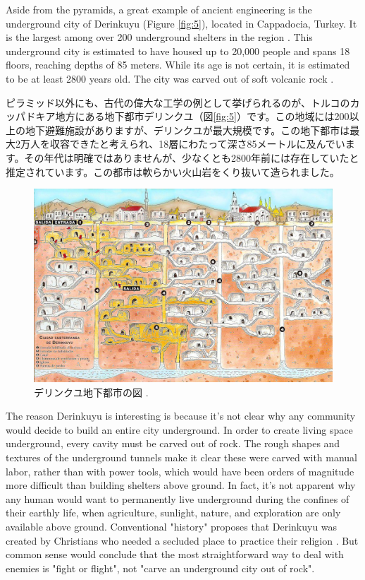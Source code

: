 \documentclass[10pt,twocolumn,letterpaper]{article}
\begin{document}
Aside from the pyramids, a great example of ancient engineering is the underground city of Derinkuyu (Figure \ref{fig:5}), located in Cappadocia, Turkey. It is the largest among over 200 underground shelters in the region \cite{54}. This underground city is estimated to have housed up to 20,000 people and spans 18 floors, reaching depths of 85 meters. While its age is not certain, it is estimated to be at least 2800 years old. The city was carved out of soft volcanic rock \cite{52, 53}.

ピラミッド以外にも、古代の偉大な工学の例として挙げられるのが、トルコのカッパドキア地方にある地下都市デリンクユ（図\ref{fig:5}）です。この地域には200以上の地下避難施設がありますが、デリンクユが最大規模です\cite{54}。この地下都市は最大2万人を収容できたと考えられ、18層にわたって深さ85メートルに及んでいます。その年代は明確ではありませんが、少なくとも2800年前には存在していたと推定されています。この都市は軟らかい火山岩をくり抜いて造られました\cite{52, 53}。

\begin{figure}[b]
\begin{center}
   \includegraphics[width=1\linewidth]{derinkuyu.jpeg}
\end{center}
   \caption{デリンクユ地下都市の図 \cite{56}.}
\label{fig:5}
\label{fig:onecol}
\end{figure}
The reason Derinkuyu is interesting is because it's not clear why any community would decide to build an entire city underground. In order to create living space underground, every cavity must be carved out of rock. The rough shapes and textures of the underground tunnels make it clear these were carved with manual labor, rather than with power tools, which would have been orders of magnitude more difficult than building shelters above ground. In fact, it's not apparent why any human would want to permanently live underground during the confines of their earthly life, when agriculture, sunlight, nature, and exploration are only available above ground. Conventional "history" proposes that Derinkuyu was created by Christians who needed a secluded place to practice their religion \cite{53}. But common sense would conclude that the most straightforward way to deal with enemies is "fight or flight", not "carve an underground city out of rock".
\end{document}
